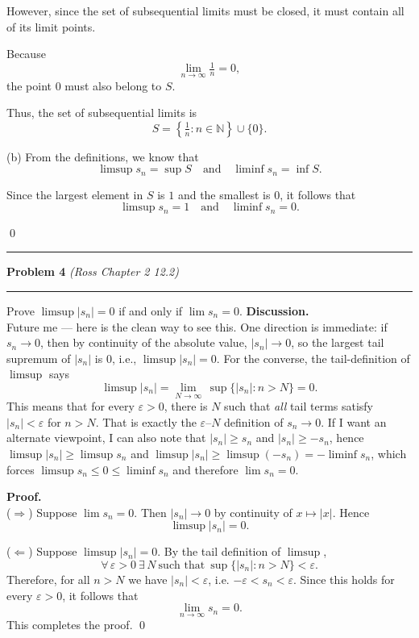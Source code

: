 \documentclass[12pt]{article}
\newcommand{\problem}[2][]{%
  \vspace{0.5em}
  \hrule\vspace{0.4em}
  \textbf{Problem #2}\if\relax\detokenize{#1}\relax\else\; \textit{(#1)}\fi
  \vspace{0.25em}\hrule\vspace{0.8em}
}
\begin{document}
However, since the set of subsequential limits must be closed, it must contain all of its limit points.  

Because
\[
\lim_{n \to \infty} \tfrac{1}{n} = 0,
\]
the point $0$ must also belong to $S$.  

Thus, the set of subsequential limits is
\[
S = \left\{ \tfrac{1}{n} : n \in \mathbb{N} \right\} \cup \{0\}.
\]

(b) From the definitions, we know that
\[
\limsup s_n = \sup S
\quad \text{and} \quad
\liminf s_n = \inf S.
\]

Since the largest element in $S$ is $1$ and the smallest is $0$, it follows that
\[
\limsup s_n = 1
\quad \text{and} \quad
\liminf s_n = 0.
\]

\qed

\problem[Ross Chapter 2 12.2]{4}
Prove $\limsup |s_n| = 0$ if and only if $\lim s_n = 0$.
\vspace{0.75em}
\textbf{Discussion.} \\
Future me — here is the clean way to see this. One direction is immediate: if $s_n \to 0$, then by continuity of the absolute value, $|s_n| \to 0$, so the largest tail supremum of $|s_n|$ is $0$, i.e., $\limsup |s_n|=0$. For the converse, the tail-definition of $\limsup$ says
\[
\limsup |s_n| = \lim_{N\to\infty}\, \sup\{|s_n|: n>N\}=0.
\]
This means that for every $\varepsilon>0$, there is $N$ such that \emph{all} tail terms satisfy $|s_n|<\varepsilon$ for $n>N$. That is exactly the $\varepsilon$–$N$ definition of $s_n\to 0$. If I want an alternate viewpoint, I can also note that $|s_n|\ge s_n$ and $|s_n|\ge -s_n$, hence $\limsup|s_n|\ge \limsup s_n$ and $\limsup|s_n|\ge \limsup(-s_n)=-\liminf s_n$, which forces $\limsup s_n\le 0\le \liminf s_n$ and therefore $\lim s_n=0$.

\vspace{0.25em}
\textbf{Proof.}\\
($\Rightarrow$) Suppose $\lim s_n = 0$. Then $|s_n| \to 0$ by continuity of $x\mapsto |x|$. Hence
\[
\limsup |s_n| = 0.
\]

($\Leftarrow$) Suppose $\limsup |s_n| = 0$. By the tail definition of $\limsup$,
\[
\forall\,\varepsilon>0\ \exists\,N\ \text{such that}\ \sup\{|s_n|:n>N\}<\varepsilon.
\]
Therefore, for all $n>N$ we have $|s_n|<\varepsilon$, i.e. $-\varepsilon<s_n<\varepsilon$. Since this holds for every $\varepsilon>0$, it follows that
\[
\lim_{n\to\infty} s_n = 0.
\]
This completes the proof. \qed
\end{document}
